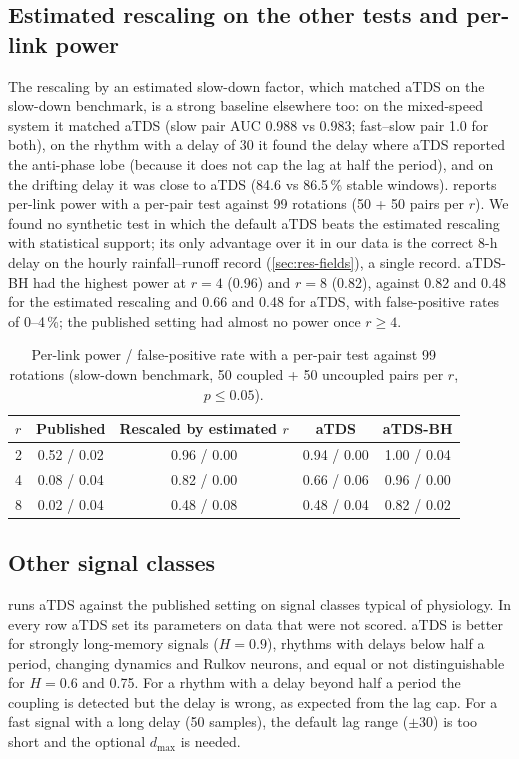 \documentclass[11pt,a4paper]{article}
\begin{document}
\subsection{Estimated rescaling on the other tests and per-link power}
\label{sec:res-power}
The rescaling by an estimated slow-down factor, which matched aTDS on the slow-down benchmark, is a strong baseline elsewhere too: on the mixed-speed system it matched aTDS (slow pair AUC 0.988 vs 0.983; fast--slow pair 1.0 for both), on the rhythm with a delay of 30 it found the delay where aTDS reported the anti-phase lobe (because it does not cap the lag at half the period), and on the drifting delay it was close to aTDS (84.6 vs 86.5\,\% stable windows).  reports per-link power with a per-pair test against 99 rotations (50 + 50 pairs per $r$). We found no synthetic test in which the default aTDS beats the estimated rescaling with statistical support; its only advantage over it in our data is the correct 8-h delay on the hourly rainfall--runoff record (\cref{sec:res-fields}), a single record. aTDS-BH had the highest power at $r = 4$ (0.96) and $r = 8$ (0.82), against 0.82 and 0.48 for the estimated rescaling and 0.66 and 0.48 for aTDS, with false-positive rates of 0--4\,\%; the published setting had almost no power once $r \ge 4$.

\begin{table}[t]
\centering
\caption{Per-link power / false-positive rate with a per-pair test against 99 rotations (slow-down benchmark, 50 coupled + 50 uncoupled pairs per $r$, $p \le 0.05$).}
\label{tab:power}
\footnotesize
\begin{tabular}{lcccc}
\toprule
$r$ & Published & Rescaled by estimated $r$ & aTDS & aTDS-BH \\
\midrule
2 & 0.52 / 0.02 & 0.96 / 0.00 & 0.94 / 0.00 & 1.00 / 0.04 \\
4 & 0.08 / 0.04 & 0.82 / 0.00 & 0.66 / 0.06 & 0.96 / 0.00 \\
8 & 0.02 / 0.04 & 0.48 / 0.08 & 0.48 / 0.04 & 0.82 / 0.02 \\
\bottomrule
\end{tabular}
\end{table}

\subsection{Other signal classes}
 runs aTDS against the published setting on signal classes typical of physiology. In every row aTDS set its parameters on data that were not scored. aTDS is better for strongly long-memory signals ($H = 0.9$), rhythms with delays below half a period, changing dynamics and Rulkov neurons, and equal or not distinguishable for $H = 0.6$ and 0.75. For a rhythm with a delay beyond half a period the coupling is detected but the delay is wrong, as expected from the lag cap. For a fast signal with a long delay (50 samples), the default lag range ($\pm30$) is too short and the optional $d_{\max}$ is needed.
\end{document}
